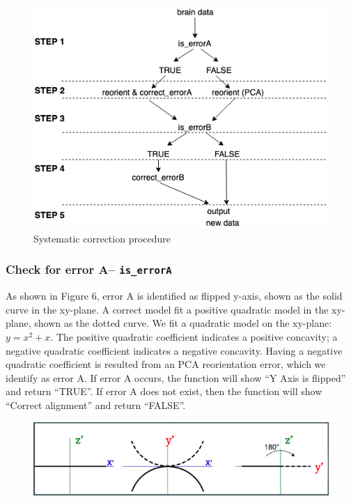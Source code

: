 \documentclass[10pt,letterpaper]{article}
\begin{document}
\begin{figure}[H]
\includegraphics[width=0.9\linewidth]{visualization_paper/cranium_procedure} \caption{Systematic correction procedure}\label{fig:Figure5}
\end{figure}

\hypertarget{check-for-error-a-is_errora}{%
\subsubsection{\texorpdfstring{Check for error A--
\texttt{is\_errorA}}{Check for error A-- is\_errorA}}\label{check-for-error-a-is_errora}}

As shown in Figure 6, error A is identified as flipped y-axis, shown as
the solid curve in the xy-plane. A correct model fit a positive
quadratic model in the xy-plane, shown as the dotted curve. We fit a
quadratic model on the xy-plane: \(y=x^2 + x\). The positive quadratic
coefficient indicates a positive concavity; a negative quadratic
coefficient indicates a negative concavity. Having a negative quadratic
coefficient is resulted from an PCA reorientation error, which we
identify as error A. If error A occurs, the function will show ``Y Axis
is flipped'' and return ``TRUE''. If error A does not exist, then the
function will show ``Correct alignment'' and return ``FALSE''.

\begin{figure}[H]
\includegraphics[width=0.9\linewidth]{visualization_paper/error_correctionA} \end{figure}
\end{document}

